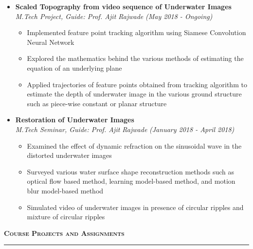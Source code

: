 \documentclass[a4paper,10pt]{article}
\newcommand{\isep}{-2 pt}
\newcommand{\lsep}{-0.5cm}
\newcommand{\resheading}[1]{{\small
        {
            \begin{minipage}
                {0.992\textwidth}\textbf{{\textsc{#1 \vphantom{p\^{E}} }}}
                \\[-0.3cm]
                \hrule
            \end{minipage}
            \\[-0.5cm]
        }
 }}
\begin{document}
\begin{itemize}
\item \textbf{Scaled Topography from video sequence of Underwater Images}  \\
    \emph{M.Tech Project, Guide: Prof. Ajit Rajwade} \hfill {\emph{(May 2018 - Ongoing)}}
    \\[-0.6cm]
    \begin{itemize}
    	\item Implemented feature point tracking algorithm using Siamese Convolution Neural Network
    	\item Explored the mathematics behind the various methods of estimating the equation of an underlying plane
    	\item Applied trajectories of feature points obtained from tracking algorithm to estimate the depth of underwater image in the various ground structure such as piece-wise constant or planar structure
    \end{itemize}

\item \textbf{Restoration of Underwater Images} \\
    \emph{M.Tech Seminar, Guide:  Prof.  Ajit Rajwade}
    \hfill {\emph{(January 2018 - April 2018)}}
    \\ [-0.6cm]
      \begin{itemize}\itemsep \isep
        \item Examined the effect of dynamic refraction on the sinusoidal wave in the distorted underwater images
        
        
        \item Surveyed various water surface shape reconstruction methods such as optical flow based method, learning model-based method, and motion blur model-based method
         
        
        \item Simulated video of underwater images in presence of circular ripples and mixture of circular ripples
    \\ [-0.6cm]
      \end{itemize}
\end{itemize}
\resheading{\textbf{\large Course Projects and Assignments}}\\[\lsep]
\end{document}
